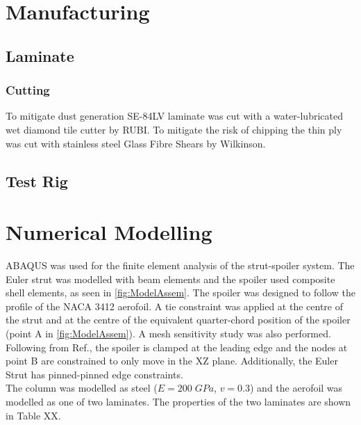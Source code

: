 \documentclass{IEEEtran}
\begin{document}
		
	\section{Manufacturing}
    \subsection{Laminate}
    \subsubsection{Cutting}
    To mitigate dust generation SE-84LV laminate was cut with a water-lubricated wet diamond tile cutter by RUBI. To mitigate the risk of chipping the thin ply was cut with stainless steel Glass Fibre Shears by Wilkinson.
    \subsection{Test Rig}

    \section{Numerical Modelling}
    ABAQUS was used for the finite element analysis of the strut-spoiler system. The Euler strut was modelled with beam elements and the spoiler used composite shell elements, as seen in \cref{fig:ModelAssem}. The spoiler was designed to follow the profile of the NACA 3412 aerofoil. 
    A tie constraint was applied at the centre of the strut and at the centre of the equivalent quarter-chord position of the spoiler (point A in \cref{fig:ModelAssem}). A mesh sensitivity study was also performed. Following from Ref.\cite{Wheatcroft_2023}, the spoiler is clamped at the leading edge and the nodes at point B are constrained to only move in the XZ plane. Additionally, the Euler Strut has pinned-pinned edge constraints. 
    \\
    The column was modelled as steel ($E = 200\;GPa$, $v=0.3$) and the aerofoil was modelled as one of two laminates.  The properties of the two laminates are shown in Table XX.
\end{document}
